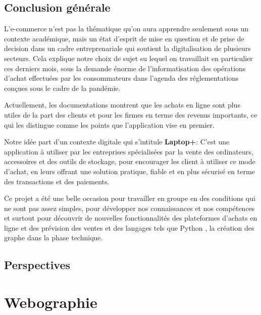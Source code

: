 \documentclass[a4paper]{report}
\begin{document}
\begin{doublespace}
\begin{doublespace}
\begin{doublespace}
\begin{doublespace}
\begin{doublespace}
                    \section{Conclusion générale}
                    L'e-commerce n'est pas la thématique qu'on aura
                    apprendre seulement sous un contexte académique, mais un état d'esprit de mise
                    en question et de prise de decision dans un cadre entreprenariale qui soutient
                    la digitalisation de plusieurs secteurs. Cela explique notre choix de sujet su
                    lequel on travaillait en particulier ces derniers mois, sous la demande énorme
                    de l'informatisation des opérations d'achat effectuées par les consommateurs
                    dans l'agenda des réglementations conçues sous le cadre de la pandémie.

                    Actuellement, les documentations montrent que les
                    achats en ligne sont plus utiles de la part des clients et pour les firmes en
                    terme des revenus importants, ce qui les distingue comme les points que
                    l'application vise en premier.

                    Notre idée part d'un contexte digitale qui s'intitule
                    \textbf{Laptop+}: C’est une application à utiliser par les entreprises
                    spécialisées par la vente des ordinateurs, accessoires et des outils de
                    stockage, pour encourager les client à utiliser ce mode d'achat, en leurs
                    offrant une solution pratique, fiable et en plus  sécurisé en terme des
                    transactions et des paiements.

                    Ce projet a été une belle occasion pour travailler en
                    groupe en des conditions qui ne sont pas assez simples, pour développer nos
                    connaissances et nos compétences et surtout pour
                    découvrir de nouvelles fonctionnalités des plateformes d'achats en ligne et des
                    prévision des ventes et des langages tels que Python , la création des graphe
                    dans la phase technique.
                    \section{Perspectives}
                    \chapter{Webographie}
                    \fancyhead[L]{\hspace*{5cm}}

\end{doublespace}
\end{doublespace}
\end{doublespace}
\end{doublespace}
\end{doublespace}
\end{document}
